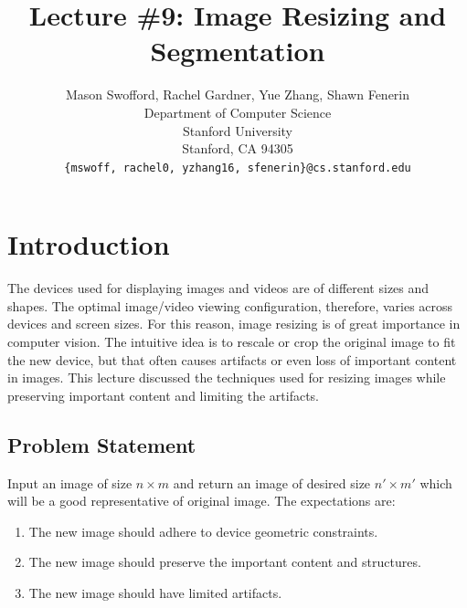 \documentclass{article}
\title{Lecture \#9: Image Resizing and Segmentation}
\author{
  Mason Swofford, Rachel Gardner, Yue Zhang, Shawn Fenerin \\
  Department of Computer Science\\
  Stanford University\\
  Stanford, CA 94305 \\
  \texttt{\{mswoff, rachel0, yzhang16, sfenerin\}@cs.stanford.edu} \\
}
\begin{document}
\maketitle

\section{Introduction}
The devices used for displaying images and videos are of different sizes and shapes. The optimal image/video viewing configuration, therefore, varies across devices and screen sizes. For this reason, image resizing is of great importance in computer vision. The intuitive idea is to rescale or crop the original image to fit the new device, but that often causes artifacts or even loss of important content in images. This lecture discussed the techniques used for resizing images while preserving important content and limiting the artifacts.
\subsection{Problem Statement}
Input an image of size $n\times m$ and return an image of desired size $n'\times m'$ which will be a good representative of original image. The expectations are:
\begin{enumerate}
\item The new image should adhere to device geometric constraints.
\item The new image should preserve the important content and structures.
\item The new image should have limited artifacts.
\end{enumerate}
\end{document}
